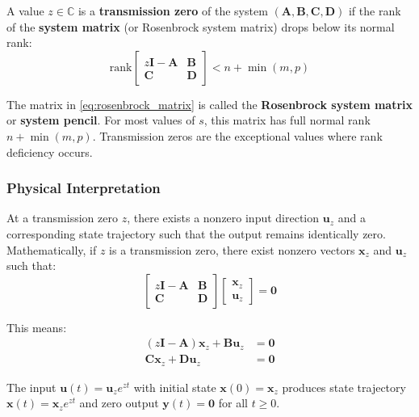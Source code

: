 \begin{definition}
A value $z \in \mathbb{C}$ is a \textbf{transmission zero} of the system $(\mathbf{A}, \mathbf{B}, \mathbf{C}, \mathbf{D})$ if the rank of the \textbf{system matrix} (or Rosenbrock system matrix) drops below its normal rank:
\begin{equation}
\text{rank}\begin{bmatrix} z\mathbf{I} - \mathbf{A} & \mathbf{B} \\ \mathbf{C} & \mathbf{D} \end{bmatrix} < n + \min(m, p)
\label{eq:rosenbrock_matrix}
\end{equation}
\end{definition}

The matrix in \eqref{eq:rosenbrock_matrix} is called the \textbf{Rosenbrock system matrix} or \textbf{system pencil}. For most values of $s$, this matrix has full normal rank $n + \min(m, p)$. Transmission zeros are the exceptional values where rank deficiency occurs.

\subsubsection{Physical Interpretation}

At a transmission zero $z$, there exists a nonzero input direction $\mathbf{u}_z$ and a corresponding state trajectory such that the output remains identically zero. Mathematically, if $z$ is a transmission zero, there exist nonzero vectors $\mathbf{x}_z$ and $\mathbf{u}_z$ such that:
\begin{equation}
\begin{bmatrix} z\mathbf{I} - \mathbf{A} & \mathbf{B} \\ \mathbf{C} & \mathbf{D} \end{bmatrix} \begin{bmatrix} \mathbf{x}_z \\ \mathbf{u}_z \end{bmatrix} = \mathbf{0}
\end{equation}

This means:
\begin{align}
(z\mathbf{I} - \mathbf{A})\mathbf{x}_z + \mathbf{B}\mathbf{u}_z &= \mathbf{0} \\
\mathbf{C}\mathbf{x}_z + \mathbf{D}\mathbf{u}_z &= \mathbf{0}
\end{align}

The input $\mathbf{u}(t) = \mathbf{u}_z e^{zt}$ with initial state $\mathbf{x}(0) = \mathbf{x}_z$ produces state trajectory $\mathbf{x}(t) = \mathbf{x}_z e^{zt}$ and zero output $\mathbf{y}(t) = \mathbf{0}$ for all $t \geq 0$.

